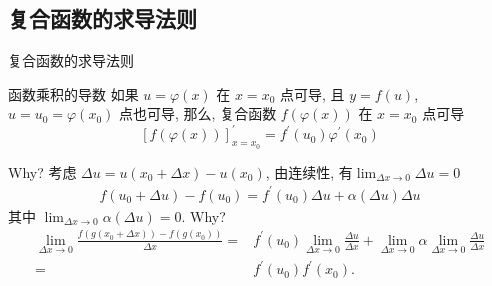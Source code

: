 \documentclass[
10pt,
aspectratio=43,
]{beamer}
\begin{document}
\subsection{复合函数的求导法则}
\begin{frame}{复合函数的求导法则}
	\begin{block}{函数乘积的导数}
		如果 $u=\varphi(x)$ 在 $x=x_0$ 点可导, 且 $y=f(u)$, $u=u_0=\varphi\left(x_0\right)$ 点也可导, 那么, 复合函数 $f(\varphi(x))$ 在 $x=x_0$ 点可导
		\[
			[f(\varphi(x))]_{x=x_0}^{\prime}=f^{\prime}\left(u_0\right) \varphi^{\prime}\left(x_0\right)
		\]
	\end{block}
	Why? \pause 考虑 $\Delta u = u(x_0+\Delta x) - u(x_0)$, \pause 由连续性, 有$\lim_{\Delta x\to0}\Delta u=0$ \pause
	\begin{align*}
		f\left(u_0+\Delta u\right)-f\left(u_0\right)=f^{\prime}\left(u_0\right) \Delta u+\alpha(\Delta u) \Delta u 
	\end{align*}
	其中 $\lim_{\Delta x\to0}\alpha(\Delta u)=0$. \pause Why? \pause 
	\begin{align*}
		\lim _{\Delta x \rightarrow 0} \frac{f\left(g\left(x_0+\Delta x\right)\right)-f\left(g\left(x_0\right)\right)}{\Delta x}= & f^{\prime}\left(u_0\right) \lim _{\Delta x \rightarrow 0} \frac{\Delta u}{\Delta x}+\lim _{\Delta x \rightarrow 0} \alpha \lim _{\Delta x \rightarrow 0} \frac{\Delta u}{\Delta x} \\
		=                                                                                                                         & f^{\prime}\left(u_0\right)f^{\prime}\left(x_0\right).                                                                                                                              
	\end{align*}
\end{frame}
\end{document}
